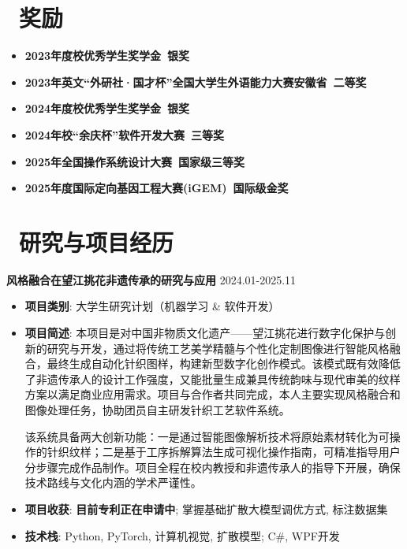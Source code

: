 \documentclass[11pt]{article}
\begin{document}
\section{\makebox[\widthof{\faGraduationCap}][c]{\color{CVBlue}\faTrophy}\ 奖励}
\begin{itemize}
    \item \textbf{2023年度校优秀学生奖学金\ 银奖}
    \item \textbf{2023年英文“外研社·国才杯”全国大学生外语能力大赛安徽省\ 二等奖}
    \item \textbf{2024年度校优秀学生奖学金\ 银奖}
    \item \textbf{2024年校“余庆杯”软件开发大赛\ 三等奖}
    \item \textbf{2025年全国操作系统设计大赛\ 国家级三等奖}
    \item \textbf{2025年度国际定向基因工程大赛(iGEM)\ 国际级金奖}
    
\end{itemize}

\vspace*{0.6em}

\section{\makebox[\widthof{\faGraduationCap}][c]{\color{CVBlue}\faUniversity}\ 研究与项目经历}

\vspace*{0.2em}

\textbf{\large \color{CVBlue} 风格融合在望江挑花非遗传承的研究与应用} \hfill 2024.01-2025.11
\begin{itemize}
    \item \textbf{项目类别}: 大学生研究计划（机器学习 \& 软件开发）
    \item \textbf{项目简述}: 本项目是对中国非物质文化遗产——望江挑花进行数字化保护与创新的研究与开发，通过将传统工艺美学精髓与个性化定制图像进行智能风格融合，最终生成自动化针织图样，构建新型数字化创作模式。该模式既有效降低了非遗传承人的设计工作强度，又能批量生成兼具传统韵味与现代审美的纹样方案以满足商业应用需求。项目与合作者共同完成，本人主要实现风格融合和图像处理任务，协助团员自主研发针织工艺软件系统。
    
    该系统具备两大创新功能：一是通过智能图像解析技术将原始素材转化为可操作的针织纹样；二是基于工序拆解算法生成可视化操作指南，可精准指导用户分步骤完成作品制作。项目全程在校内教授和非遗传承人的指导下开展，确保技术路线与文化内涵的学术严谨性。

    \item[\textcolor{CVBlue}{\faStar}] \textbf{\textcolor{CVBlue}{项目收获}}: \textbf{目前专利正在申请中}; \quad 掌握基础扩散大模型调优方式, 标注数据集
    \item \textbf{技术栈}: Python, PyTorch, 计算机视觉, 扩散模型; C\#, WPF开发
\end{itemize}
\end{document}
